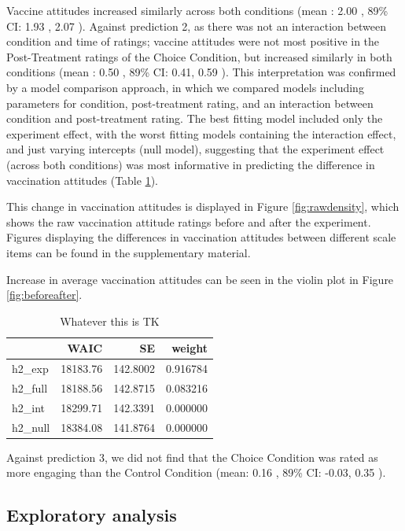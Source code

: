 \documentclass[
  english,
  ,jou,floatsintext]{apa6}
\begin{document}
Vaccine attitudes increased similarly across both conditions (mean : 2.00 , 89\% CI: 1.93 , 2.07 ). Against prediction 2, as there was not an interaction between condition and time of ratings; vaccine attitudes were not most positive in the Post-Treatment ratings of the Choice Condition, but increased similarly in both conditions (mean : 0.50 , 89\% CI: 0.41, 0.59 ). This interpretation was confirmed by a model comparison approach, in which we compared models including parameters for condition, post-treatment rating, and an interaction between condition and post-treatment rating. The best fitting model included only the experiment effect, with the worst fitting models containing the interaction effect, and just varying intercepts (null model), suggesting that the experiment effect (across both conditions) was most informative in predicting the difference in vaccination attitudes (Table \ref{tab:h2waics}).

This change in vaccination attitudes is displayed in Figure \ref{fig:rawdensity}, which shows the raw vaccination attitude ratings before and after the experiment. Figures displaying the differences in vaccination attitudes between different scale items can be found in the supplementary material.

Increase in average vaccination attitudes can be seen in the violin plot in Figure \ref{fig:beforeafter}.

\begin{table}

\caption{\label{tab:h2waics}Whatever this is TK}
\centering
\begin{tabular}[t]{l|r|r|r}
\hline
  & WAIC & SE & weight\\
\hline
h2\_exp & 18183.76 & 142.8002 & 0.916784\\
\hline
h2\_full & 18188.56 & 142.8715 & 0.083216\\
\hline
h2\_int & 18299.71 & 142.3391 & 0.000000\\
\hline
h2\_null & 18384.08 & 141.8764 & 0.000000\\
\hline
\end{tabular}
\end{table}

Against prediction 3, we did not find that the Choice Condition was rated as more engaging than the Control Condition (mean: 0.16 , 89\% CI: -0.03, 0.35 ).

\hypertarget{exploratory-analysis}{%
\subsection{Exploratory analysis}\label{exploratory-analysis}}
\end{document}
